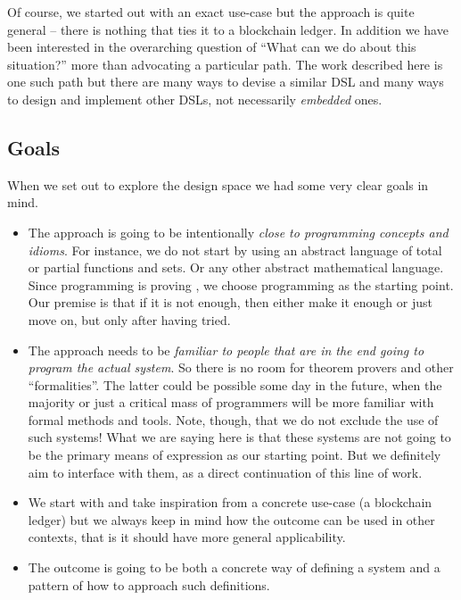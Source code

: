 \documentclass[11pt]{article}
\begin{document}
Of course, we started out with an exact use-case but the approach is quite general -- there is nothing that ties it to a blockchain ledger. In addition we have been interested in the overarching question of ``What can we do about this situation?'' more than advocating a particular path. The work described here is one such path but there are many ways to devise a similar DSL and many ways to design and implement other DSLs, not necessarily \textit{embedded} ones.

\subsection{Goals}
\label{sec:goals}
When we set out to explore the design space we had some very clear goals in mind.

\begin{itemize}
  \item The approach is going to be intentionally \textit{close to programming concepts and idioms}. For instance, we do not start by using an abstract language of total or partial functions and sets. Or any other abstract mathematical language. Since programming is proving \cite{site:proofs-as-programs}, we choose programming as the starting point. Our premise is that if it is not enough, then either make it enough or just move on, but only after having tried.
  
  \item The approach needs to be \textit{familiar to people that are in the end going to program the actual system}. So there is no room for theorem provers and other ``formalities''. The latter could be possible some day in the future, when the majority or just a critical mass of programmers will be more familiar with formal methods and tools. Note, though, that we do not exclude the use of such systems! What we are saying here is that these systems are not going to be the primary means of expression as our starting point. But we definitely aim to interface with them, as a direct continuation of this line of work.
    
  \item We start with and take inspiration from a concrete use-case (a blockchain ledger) but we always keep in mind how the outcome can be used in other contexts, that is it should have more general applicability.
  
  \item The outcome is going to be both a concrete way of defining a system and a pattern of how to approach such definitions. 
  

\end{itemize}
\end{document}
